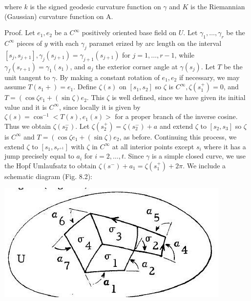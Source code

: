 \documentclass[10pt]{article}
\begin{document}
where $k$ is the signed geodesic curvature function on $\gamma$ and $K$ is the Riemannian (Gaussian) curvature function on A.

Proof. Let $e_{1}, e_{2}$ be a $C^{\infty}$ positively oriented base field on $U$. Let $\gamma_{1}, \ldots, \gamma_{r}$ be the $C^{\infty}$ pieces of $y$ with each $\gamma_{j}$ paramet erized by arc length on the interval $\left[s_{j}, s_{j+1}\right], \gamma_{j}\left(s_{j+1}\right)=\gamma_{j+1}\left(s_{j+1}\right)$ for $j=1, \ldots, r-1$, while $\gamma_{f}\left(s_{r+1}\right)=\gamma_{1}\left(s_{1}\right)$, and $a_{j}$ the exterior corner angle at $\gamma\left(s_{j}\right)$. Let $T$ be the unit tangent to $\gamma$. By making a constant rotation of $e_{1}, e_{2}$ if necessary, we may assume $T\left(s_{1}+\right)=e_{1}$. Define $\zeta(s)$ on $\left[s_{1}, s_{2}\right]$ so $\zeta$ is $C^{\infty}, \zeta\left(s_{1}^{+}\right)=0$, and $T=\left(\cos \zeta e_{1}+(\sin \zeta) e_{2}\right.$. This $\zeta$ is well defined, since we have given its initial value and it is $C^{\infty}$, since locally it is given by $\zeta(s)=\cos ^{-1}<T(s), e_{1}(s)>$ for a proper branch of the inverse cosine. Thus we obtain $\zeta\left(s_{2}^{-}\right)$. Let $\zeta\left(s_{2}^{+}\right)=\zeta\left(s_{2}^{-}\right)+a$ and extend $\zeta$ to $\left[s_{2}, s_{3}\right]$ so $\zeta$ is $C^{\infty}$ and $T=\left(\cos \zeta e_{1}+(\sin \zeta) e_{2}\right.$, as before. Continuing this process, we extend $\zeta$ to $\left[s_{1}, s_{r^{+1}}\right]$ with $\zeta$ in $C^{\infty}$ at all interior points except $s_{i}$ where it has a jump precisely equal to $a_{i}$ for $i=2, \ldots, t$. Since $\gamma$ is a simple closed curve, we use the Hopf Umlaufsatz to obtain $\zeta\left(s^{-}\right)+a_{1}=\zeta\left(s_{1}^{+}\right)+2 \pi$. We include a schematic diagram (Fig. 8.2):

\includegraphics[max width=\textwidth]{2022_07_16_f4e476ee2159dc67e746g-57}
\end{document}
